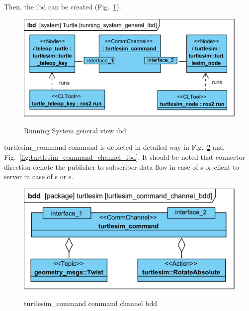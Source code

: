 \documentclass[11pt,oneside,a4paper]{report}
\begin{document}
\pagebreak

Then, the ibd can be created (Fig.~\ref{fig:running_system_general_ibd}). 

\begin{figure}[H]
	\centering
	\begin{center}
		{\includegraphics[scale=1.0]{diagrams/running_system_general_ibd.png}}
	\end{center}
	\caption{Running System general view ibd}
	\label{fig:running_system_general_ibd}
\end{figure}

\textsf{turtlesim\_command command} \stCommChannel{} is depicted in detailed way in Fig.~\ref{fig:turtlesim_command_channel_bdd} and Fig.~\ref{fig:turtlesim_command_channel_ibd}. It should be noted that connector direction denote the publisher to subscriber data flow in case of \stTopic{}s or client to server in case of \stService{}s or \stAction{}s.


\begin{figure}[H]
	\centering
	\begin{center}
		{\includegraphics[scale=1.0]{diagrams/turtlesim_command_channel_bdd.png}}
	\end{center}
	\caption{turtlesim\_command command channel bdd}
	\label{fig:turtlesim_command_channel_bdd}
\end{figure}
\end{document}

